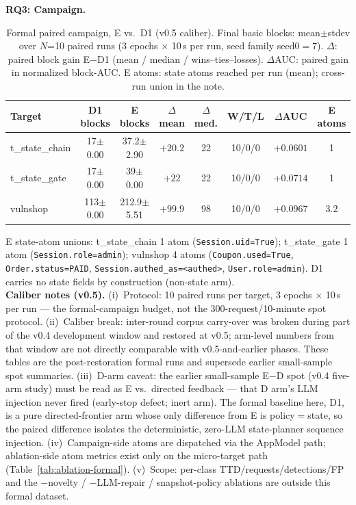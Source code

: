 \documentclass[letterpaper,twocolumn,10pt]{article}
\begin{document}
\textbf{RQ3: Campaign.} %
\begin{table}[t]
\centering
\small
\caption{Formal paired campaign, E vs.\ D1 (v0.5 caliber). Final basic blocks: mean$\pm$stdev over $N$=10 paired runs (3 epochs $\times$ 10\,s per run, seed family seed0$=$7). $\Delta$: paired block gain E$-$D1 (mean / median / wins--ties--losses). $\Delta$AUC: paired gain in normalized block-AUC. E atoms: state atoms reached per run (mean); cross-run union in the note.}
\label{tab:campaign-formal}
\begin{tabular}{lccccccc}
\hline
Target & D1 blocks & E blocks & $\Delta$ mean & $\Delta$ med. & W/T/L & $\Delta$AUC & E atoms \\
\hline
t\_state\_chain & 17$\pm$0.00 & 37.2$\pm$2.90 & $+20.2$ & 22 & 10/0/0 & $+0.0601$ & 1 \\
t\_state\_gate & 17$\pm$0.00 & 39$\pm$0.00 & $+22$ & 22 & 10/0/0 & $+0.0714$ & 1 \\
vulnshop & 113$\pm$0.00 & 212.9$\pm$5.51 & $+99.9$ & 98 & 10/0/0 & $+0.0967$ & 3.2 \\
\hline
\end{tabular}

\begin{minipage}{\textwidth}
\footnotesize
E state-atom unions: t\_state\_chain 1 atom (\texttt{Session.uid=True}); t\_state\_gate 1 atom (\texttt{Session.role=admin}); vulnshop 4 atoms (\texttt{Coupon.used=True}, \texttt{Order.status=PAID}, \texttt{Session.authed\_as=\textless authed\textgreater }, \texttt{User.role=admin}). D1 carries no state fields by construction (non-state arm).\\
\textbf{Caliber notes (v0.5).} (i)~Protocol: 10 paired runs per target, 3 epochs $\times$ 10\,s per run --- the formal-campaign budget, not the 300-request/10-minute spot protocol. (ii)~Caliber break: inter-round corpus carry-over was broken during part of the v0.4 development window and restored at v0.5; arm-level numbers from that window are not directly comparable with v0.5-and-earlier phases. These tables are the post-restoration formal runs and supersede earlier small-sample spot summaries. (iii)~D-arm caveat: the earlier small-sample E$-$D spot (v0.4 five-arm study) must be read as E vs.\ directed feedback --- that D arm's LLM injection never fired (early-stop defect; inert arm). The formal baseline here, D1, is a pure directed-frontier arm whose only difference from E is policy$=$state, so the paired difference isolates the deterministic, zero-LLM state-planner sequence injection. (iv)~Campaign-side atoms are dispatched via the AppModel path; ablation-side atom metrics exist only on the micro-target path (Table~\ref{tab:ablation-formal}). (v)~Scope: per-class TTD/requests/detections/FP and the $-$novelty / $-$LLM-repair / snapshot-policy ablations are outside this formal dataset.
\end{minipage}
\end{table}
\end{document}
